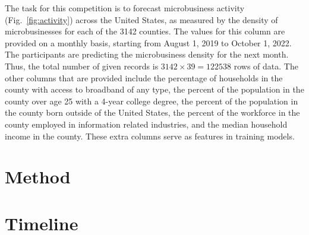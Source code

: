 \documentclass[prl,aps,superscriptaddress,twocolumn,11pt,nolongbibliography]{revtex4-2}
\begin{document}
The task for this competition is to forecast microbusiness activity (Fig.~\ref{fig:activity}) across the United States, as measured by the density of microbusinesses for each of the 3142 counties. 
The values for this column are provided on a monthly basis, starting from August 1, 2019 to October 1, 2022. 
The participants are predicting the microbusiness density for the next month. 
Thus, the total number of given records is $3142 \times 39 = 122538$ rows of data.
The other columns that are provided include the percentage of households in the county with access to broadband of any type, the percent of the population in the county over age 25 with a 4-year college degree, the percent of the population in the county born outside of the United States, the percent of the workforce in the county employed in information related industries, and the median household income in the county. 
These extra columns serve as features in training models.

\section{Method}

\section{Timeline}
\end{document}
